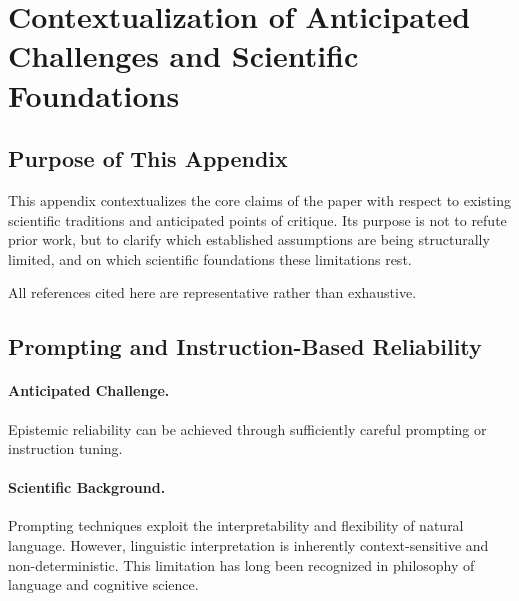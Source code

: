 
\section{Contextualization of Anticipated Challenges and Scientific Foundations}


\subsection{Purpose of This Appendix}

This appendix contextualizes the core claims of the paper with respect to existing scientific traditions and anticipated points of critique. Its purpose is not to refute prior work, but to clarify which established assumptions are being structurally limited, and on which scientific foundations these limitations rest.

All references cited here are representative rather than exhaustive.


\subsection{Prompting and Instruction-Based Reliability}

\paragraph{Anticipated Challenge.}
Epistemic reliability can be achieved through sufficiently careful prompting or instruction tuning.

\paragraph{Scientific Background.}
Prompting techniques exploit the interpretability and flexibility of natural language. However, linguistic interpretation is inherently context-sensitive and non-deterministic. This limitation has long been recognized in philosophy of language and cognitive science.

